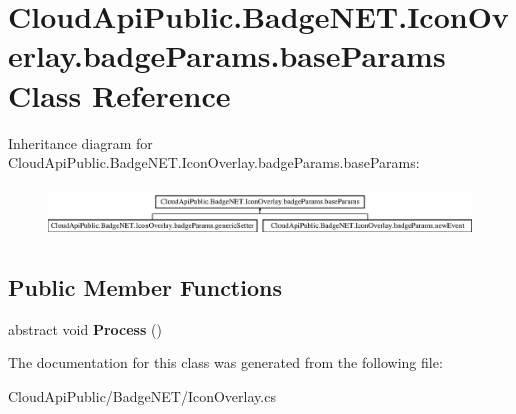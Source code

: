 \hypertarget{class_cloud_api_public_1_1_badge_n_e_t_1_1_icon_overlay_1_1badge_params_1_1base_params}{\section{Cloud\-Api\-Public.\-Badge\-N\-E\-T.\-Icon\-Overlay.\-badge\-Params.\-base\-Params Class Reference}
\label{class_cloud_api_public_1_1_badge_n_e_t_1_1_icon_overlay_1_1badge_params_1_1base_params}
}
Inheritance diagram for Cloud\-Api\-Public.\-Badge\-N\-E\-T.\-Icon\-Overlay.\-badge\-Params.\-base\-Params\-:\begin{figure}[H]
\begin{center}
\leavevmode
\includegraphics[height=1.379310cm]{class_cloud_api_public_1_1_badge_n_e_t_1_1_icon_overlay_1_1badge_params_1_1base_params}
\end{center}
\end{figure}
\subsection*{Public Member Functions}
\begin{DoxyCompactItemize}
\item 
\hypertarget{class_cloud_api_public_1_1_badge_n_e_t_1_1_icon_overlay_1_1badge_params_1_1base_params_a084f9980a716a2fc9e3932e9793444f6}{abstract void {\bfseries Process} ()}\label{class_cloud_api_public_1_1_badge_n_e_t_1_1_icon_overlay_1_1badge_params_1_1base_params_a084f9980a716a2fc9e3932e9793444f6}

\end{DoxyCompactItemize}


The documentation for this class was generated from the following file\-:\begin{DoxyCompactItemize}
\item 
Cloud\-Api\-Public/\-Badge\-N\-E\-T/Icon\-Overlay.\-cs\end{DoxyCompactItemize}
